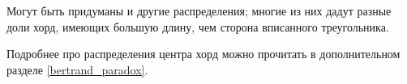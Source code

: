 \begin{exmp}
\begin{figure}[H]
		\hfill
		\hfill
	\end{figure}
	Могут быть придуманы и другие распределения; многие из них дадут разные доли хорд, имеющих большую длину, чем сторона вписанного треугольника.
	
	Подробнее про распределения центра хорд можно прочитать в дополнительном разделе \ref{bertrand_paradox}.
\end{exmp}

